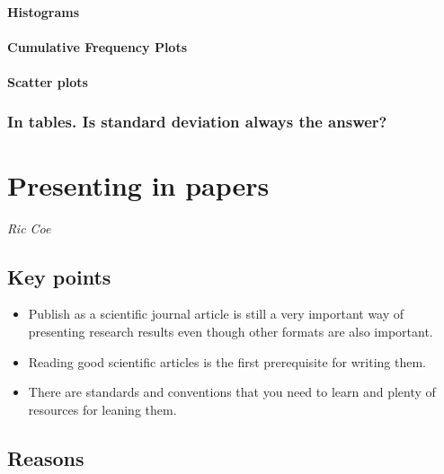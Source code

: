 \documentclass[
]{book}
\begin{document}
\hypertarget{histograms}{%
\subsubsection{Histograms}\label{histograms}}

\hypertarget{cumulative-frequency-plots}{%
\subsubsection{Cumulative Frequency Plots}\label{cumulative-frequency-plots}}

\hypertarget{scatter-plots}{%
\subsubsection{Scatter plots}\label{scatter-plots}}

\hypertarget{in-tables.-is-standard-deviation-always-the-answer}{%
\subsection{In tables. Is standard deviation always the answer?}\label{in-tables.-is-standard-deviation-always-the-answer}}

\hypertarget{papers}{%
\chapter{Presenting in papers}\label{papers}}

\emph{Ric Coe}

\hypertarget{key-points-1}{%
\section{Key points}\label{key-points-1}}

\begin{itemize}
\item
  Publish as a scientific journal article is still a very important way of presenting research results even though other formats are also important.
\item
  Reading good scientific articles is the first prerequisite for writing them.
\item
  There are standards and conventions that you need to learn and plenty of resources for leaning them.
\end{itemize}

\hypertarget{reasons}{%
\section{Reasons}\label{reasons}}
\end{document}
